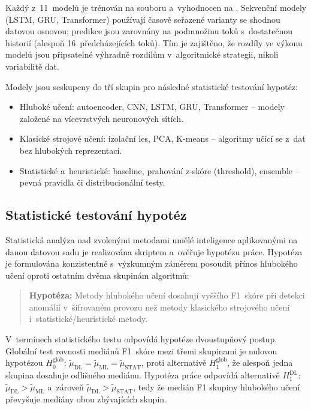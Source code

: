 Každý z~11~modelů je trénován na souboru  a~vyhodnocen na .
Sekvenční modely (LSTM, GRU, Transformer) používají časově seřazené varianty se shodnou datovou osnovou; predikce jsou zarovnány na podmnožinu toků s~dostatečnou historií (alespoň 16~předcházejících toků).
Tím je zajištěno, že rozdíly ve výkonu modelů jsou připsatelné výhradně rozdílům v~algoritmické strategii, nikoli variabilitě dat.

Modely jsou seskupeny do tří skupin pro následné statistické testování hypotéz:
\begin{itemize}
\item Hluboké učení: autoencoder, CNN, LSTM, GRU, Transformer -- modely založené na vícevrstvých neuronových sítích.
\item Klasické strojové učení: izolační les, PCA, K-means -- algoritmy učící se z~dat bez hlubokých reprezentací.
\item Statistické a~heuristické: baseline, prahování z-skóre (threshold), ensemble -- pevná pravidla či distribucionální testy.
\end{itemize}

\subsection{Statistické testování hypotéz}
\label{sec:stat-testovani}

Statistická analýza nad zvolenými metodami umělé inteligence aplikovanými na danou datovou sadu je realizována skriptem  a~ověřuje hypotézu práce. Hypotéza je formulována konzistentně s~výzkumným záměrem posoudit přínos hlubokého učení oproti ostatním dvěma skupinám algoritmů:

\begin{quote}
\textbf{Hypotéza:} Metody hlubokého učení dosahují vyššího F1~skóre při detekci anomálií v~šifrovaném provozu než metody klasického strojového učení i~statistické/heuristické metody.
\end{quote}

\noindent V~termínech statistického testu odpovídá hypotéze dvoustupňový postup. Globální test rovnosti mediánů F1~skóre mezi třemi skupinami je nulovou hypotézou $H_0^{\mathrm{glob}}$: $\tilde{\mu}_{\mathrm{DL}} = \tilde{\mu}_{\mathrm{ML}} = \tilde{\mu}_{\mathrm{STAT}}$, proti alternativě $H_1^{\mathrm{glob}}$, že alespoň jedna skupina dosahuje odlišného mediánu. Hypotéza práce odpovídá alternativě $H_1^{\mathrm{DL}}$: $\tilde{\mu}_{\mathrm{DL}} > \tilde{\mu}_{\mathrm{ML}}$ a~zároveň $\tilde{\mu}_{\mathrm{DL}} > \tilde{\mu}_{\mathrm{STAT}}$, tedy že medián F1 skupiny hlubokého učení převyšuje mediány obou zbývajících skupin.

